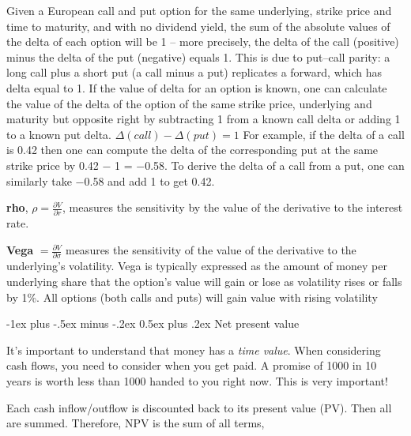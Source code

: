 \documentclass[10pt,landscape]{article}
\makeatletter
\renewcommand{\section}{\@startsection{section}{1}{0mm}%
                                {-1ex plus -.5ex minus -.2ex}%
                                {0.5ex plus .2ex}%
                                {\normalfont\large\bfseries}}
\makeatother
\begin{document}
\begin{multicols}{3}
\vspace{0.15cm}

Given a European call and put option for the same underlying, strike price and time to maturity, and with no dividend yield, the sum of the absolute values of the delta of each option will be 1 – more precisely, the delta of the call (positive) minus the delta of the put (negative) equals 1. This is due to put–call parity: a long call plus a short put (a call minus a put) replicates a forward, which has delta equal to 1. 
If the value of delta for an option is known, one can calculate the value of the delta of the option of the same strike price, underlying and maturity but opposite right by subtracting 1 from a known call delta or adding 1 to a known put delta. $\Delta (call)-\Delta (put)=1$
For example, if the delta of a call is 0.42 then one can compute the delta of the corresponding put at the same strike price by 0.42 − 1 = −0.58. To derive the delta of a call from a put, one can similarly take −0.58 and add 1 to get 0.42. 

\vspace{0.15cm}

\textbf{rho}, $\rho=\tfrac {\partial V}{\partial r}$, measures the sensitivity by the value of the derivative to the interest rate.

 \vspace{0.15cm}
 
\textbf{Vega} $=\tfrac {\partial V}{\partial \sigma}$ measures the sensitivity of the value of the derivative to the underlying's volatility. Vega is typically expressed as the amount of money per underlying share that the option's value will gain or lose as volatility rises or falls by 1\%. All options (both calls and puts) will gain value with rising volatility



\section{Net present value}

It's important to understand that money has a \textit{time value}. When considering cash flows, you need to consider when you get paid. A promise of 1000 in 10 years is worth less than 1000 handed to you right now. This is very important!

Each cash inflow/outflow is discounted back to its present value (PV). Then all are summed. Therefore, NPV is the sum of all terms,

\vspace{0.15cm}


\end{multicols}
\end{document}
